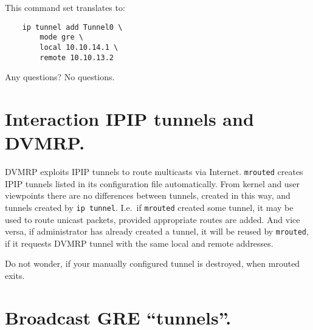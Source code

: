 This command set translates to:

\begin{verbatim}
    ip tunnel add Tunnel0 \
        mode gre \
        local 10.10.14.1 \
        remote 10.10.13.2
\end{verbatim}

Any questions? No questions.

\section{Interaction IPIP tunnels and DVMRP.}

DVMRP exploits IPIP tunnels to route multicasts via Internet.
\verb|mrouted| creates
IPIP tunnels listed in its configuration file automatically.
From kernel and user viewpoints there are no differences between
tunnels, created in this way, and tunnels created by \verb|ip tunnel|.
I.e.\ if \verb|mrouted| created some tunnel, it may be used to
route unicast packets, provided appropriate routes are added.
And vice versa, if administrator has already created a tunnel,
it will be reused by \verb|mrouted|, if it requests DVMRP
tunnel with the same local and remote addresses.

Do not wonder, if your manually configured tunnel is
destroyed, when mrouted exits.


\section{Broadcast GRE ``tunnels''.}

